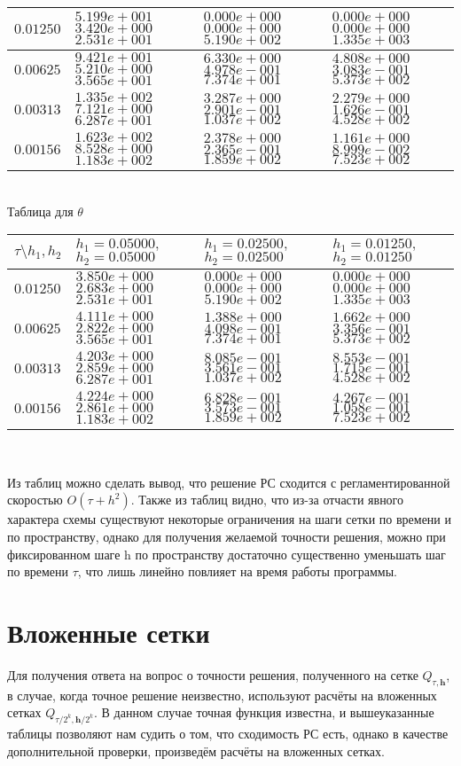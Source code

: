\documentclass[a4paper]{article}
\theoremstyle{definition}
\numberwithin{equation}{section}
\begin{document}
\begin{center}
\begin{tabular}{|p{0.8in}|p{1.2in}|p{1.2in}|p{1.2in}|}
$0.01250$ & $5.199e+001$ $3.420e+000$ $2.531e+001$ &$0.000e+000$ $0.000e+000$ $5.190e+002$ &$0.000e+000$ $0.000e+000$ $1.335e+003$  \\ \hline
$0.00625$ & $9.421e+001$ $5.210e+000$ $3.565e+001$ &$6.330e+000$ $4.978e-001$ $7.374e+001$ &$4.808e+000$ $3.083e-001$ $5.373e+002$  \\ \hline
$0.00313$ & $1.335e+002$ $7.121e+000$ $6.287e+001$ &$3.287e+000$ $2.901e-001$ $1.037e+002$ &$2.279e+000$ $1.626e-001$ $4.528e+002$  \\ \hline
$0.00156$ & $1.623e+002$ $8.528e+000$ $1.183e+002$ &$2.378e+000$ $2.365e-001$ $1.859e+002$ &$1.161e+000$ $8.999e-002$ $7.523e+002$  \\ \hline
\end{tabular}\\[20pt]
Таблица для $\theta$

\begin{tabular}{|p{0.8in}|p{1.2in}|p{1.2in}|p{1.2in}|} \hline
$\tau\setminus h_1, h_2$ & $h_1=0.05000 ,$ $h_2=0.05000$& $h_1=0.02500 ,$ $h_2=0.02500$& $h_1=0.01250 ,$ $h_2=0.01250$ \\ \hline

$0.01250$ & $3.850e+000$ $2.683e+000$ $2.531e+001$ &$0.000e+000$ $0.000e+000$ $5.190e+002$ &$0.000e+000$ $0.000e+000$ $1.335e+003$  \\ \hline
$0.00625$ & $4.111e+000$ $2.822e+000$ $3.565e+001$ &$1.388e+000$ $4.098e-001$ $7.374e+001$ &$1.662e+000$ $3.356e-001$ $5.373e+002$  \\ \hline
$0.00313$ & $4.203e+000$ $2.859e+000$ $6.287e+001$ &$8.085e-001$ $3.561e-001$ $1.037e+002$ &$8.553e-001$ $1.715e-001$ $4.528e+002$  \\ \hline
$0.00156$ & $4.224e+000$ $2.861e+000$ $1.183e+002$ &$6.828e-001$ $3.573e-001$ $1.859e+002$ &$4.267e-001$ $1.058e-001$ $7.523e+002$  \\ \hline
\end{tabular}\\[20pt]
\end{center}
\newpage
Из таблиц можно сделать вывод, что решение РС сходится с регламентированной скоростью  $O(\tau + h^2)$. Также из таблиц видно, что из-за отчасти явного характера схемы существуют некоторые ограничения на шаги сетки по времени и по пространству, однако для получения желаемой точности решения, можно при фиксированном шаге h по пространству достаточно существенно уменьшать шаг по времени $\tau$, что лишь линейно повлияет на время работы программы.
\newpage
\section{Вложенные сетки}
Для получения ответа на вопрос о точности решения, полученного на сетке $Q_{\tau,\textbf{h}}$, в случае, когда точное решение неизвестно, используют расчёты на вложенных сетках $Q_{\tau/2^k,\textbf{h}/2^k}$. В данном случае точная функция известна, и вышеуказанные таблицы позволяют нам судить о том, что сходимость РС есть, однако в качестве дополнительной проверки, произведём расчёты на вложенных сетках.
\end{document}
